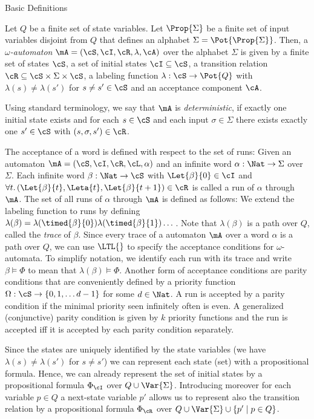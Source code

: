 \documentclass[copyright,creativecommons]{eptcs}
\begin{document}
\begin{section}{Basic Definitions}
\begin{definition}
Let $Q$ be a finite set of state variables. Let $\Prop{\Sigma}$ be a finite set of input variables disjoint from $Q$ that defines an alphabet $\Sigma=\Pot{\Prop{\Sigma}}$. Then, a \emph{$\omega$-automaton} $\mA=(\cS,\cI,\cR,\lambda,\cA)$ over the alphabet $\Sigma$ is given by a finite set of states $\cS$, a set of initial states $\cI \subseteq \cS$, a transition relation $\cR \subseteq \cS \times \Sigma \times \cS$, a labeling function $\lambda:\cS \rightarrow \Pot{Q}$ with $\lambda(s) \neq \lambda(s')$ for $s \neq s' \in \cS$ and an acceptance component $\cA$.
\end{definition}

\noindent Using standard terminology, we say that $\mA$ is \emph{deterministic}, if exactly one initial state exists and for each $s \in \cS$ and each input $\sigma \in \Sigma$ there exists exactly one $s' \in \cS$ with  $(s,\sigma,s') \in \cR$.

The acceptance of a word is defined with respect to the set of runs: Given an automaton $\mA=(\cS,\cI,\cR,\cL,\alpha)$ and an infinite word $\alpha:\Nat \rightarrow\Sigma$ over $\Sigma$. Each infinite word $\beta:\Nat \rightarrow \cS$ with $\Let{\beta}{0}\in \cI$ and $\forall t. \left(\Let{\beta}{t},\Leta{t},\Let{\beta}{t+1}\right) \in \cR$ is called a run of $\alpha$ through $\mA$. The set of all runs of $\alpha$ through $\mA$ is defined as follows: We extend the labeling function to runs by defining $\lambda(\beta)=\lambda(\timed{\beta}{0})\lambda(\timed{\beta}{1})\dots$.
Note that $\lambda(\beta)$ is a path over $Q$, called the \emph{trace} of $\beta$. Since every trace of a automaton $\mA$ over a word $\alpha$ is a path over $Q$, we can use $\LTL{}$ to specify the acceptance conditions for $\omega$-automata. To simplify notation, we identify each run with its trace and write $\beta \models \Phi$ to mean that $\lambda(\beta) \models \Phi$. Another form of acceptance conditions are parity conditions that are conveniently defined by a priority function $\Omega:\cS \rightarrow \{0,1,\dots d-1\}$ for some $d \in \Nat$. A run is accepted by a parity condition if the minimal priority seen infinitely often is even. A generalized (conjunctive) parity condition is given by $k$ priority functions and the run is accepted iff it is accepted by each parity condition separately.


Since the states are uniquely identified by the state variables (we have $\lambda(s)\neq \lambda(s')$ for $s \neq s'$)
we can represent each state (set) with a propositional formula.
Hence, we can already represent the set of initial states by a propositional formula $\Phi_\cI$ over $Q \cup \Var{\Sigma}$.
Introducing moreover for each variable $p \in Q $ a next-state variable $p'$ allows us to represent also
the transition relation by a propositional formula $\Phi_\cR$ over $Q\cup\Var{\Sigma}\cup\{p' \mid p \in Q \}$.
\end{section}
\end{document}

